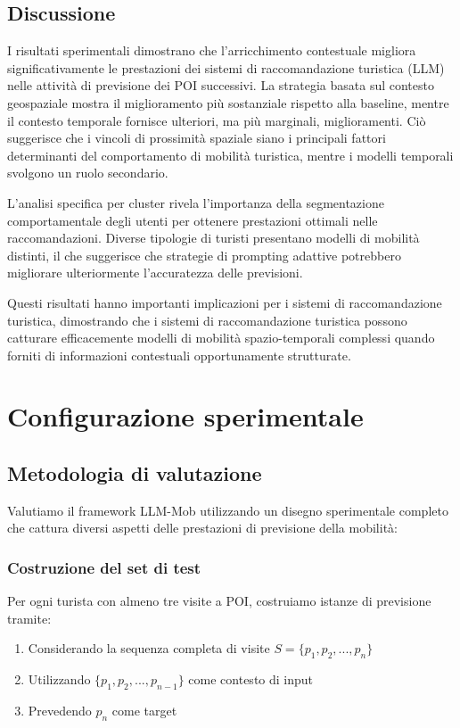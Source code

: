 \documentclass[12pt,a4paper]{article}
\begin{document}
\subsection{Discussione}

I risultati sperimentali dimostrano che l'arricchimento contestuale migliora significativamente le prestazioni dei sistemi di raccomandazione turistica (LLM) nelle attività di previsione dei POI successivi. La strategia basata sul contesto geospaziale mostra il miglioramento più sostanziale rispetto alla baseline, mentre il contesto temporale fornisce ulteriori, ma più marginali, miglioramenti. Ciò suggerisce che i vincoli di prossimità spaziale siano i principali fattori determinanti del comportamento di mobilità turistica, mentre i modelli temporali svolgono un ruolo secondario.

L'analisi specifica per cluster rivela l'importanza della segmentazione comportamentale degli utenti per ottenere prestazioni ottimali nelle raccomandazioni. Diverse tipologie di turisti presentano modelli di mobilità distinti, il che suggerisce che strategie di prompting adattive potrebbero migliorare ulteriormente l'accuratezza delle previsioni.

Questi risultati hanno importanti implicazioni per i sistemi di raccomandazione turistica, dimostrando che i sistemi di raccomandazione turistica possono catturare efficacemente modelli di mobilità spazio-temporali complessi quando forniti di informazioni contestuali opportunamente strutturate.

\newpage

\newpage
\section{Configurazione sperimentale}

\subsection{Metodologia di valutazione}

Valutiamo il framework LLM-Mob utilizzando un disegno sperimentale completo che cattura diversi aspetti delle prestazioni di previsione della mobilità:

\subsubsection{Costruzione del set di test}
Per ogni turista con almeno tre visite a POI, costruiamo istanze di previsione tramite:
\begin{enumerate}
\item Considerando la sequenza completa di visite $S = \{p_1, p_2, ..., p_n\}$
\item Utilizzando $\{p_1, p_2, ..., p_{n-1}\}$ come contesto di input
\item Prevedendo $p_n$ come target
\end{enumerate}
\end{document}
